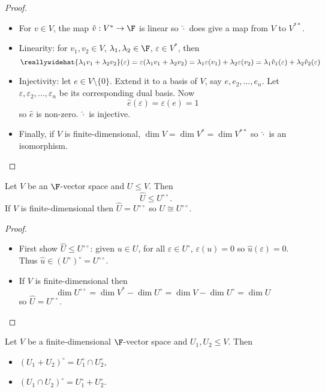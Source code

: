 \documentclass[a4paper]{article}
\newcommand*{\ann}{\circ}
\theoremstyle{definition}
\begin{document}
\begin{proof}\leavevmode
  \begin{itemize}
  \item For \(v\in V\), the map \(\hat v: V^* \to \F\) is linear so \(\hat \cdot\) does give a map from \(V\) to \(V^{**}\).
  \item Linearity: for \(v_1, v_2 \in V\), \(\lambda_1, \lambda_2 \in \F\), \(\varepsilon \in V^*\), then
    \[
      \reallywidehat{\lambda_1v_1 + \lambda_2v_2}(\varepsilon) = \varepsilon(\lambda_1v_1 + \lambda_2v_2) = \lambda_1 \varepsilon(v_1) + \lambda_2 \varepsilon(v_2) = \lambda_1 \hat v_1(\varepsilon) + \lambda_2 \hat v_2(\varepsilon)
    \]
  \item Injectivity: let \(e \in V\setminus\{0\}\). Extend it to a basis of \(V\), say \(e, e_2,\dots, e_n\). Let \(\varepsilon, \varepsilon_2,\dots, \varepsilon_n\) be its corresponding dual basis. Now
    \[
      \hat e(\varepsilon) = \varepsilon(e) = 1 
    \]
    so \(\hat e\) is non-zero. \(\hat \cdot\) is injective.
  \item Finally, if \(V\) is finite-dimensional, \(\dim V = \dim V^* = \dim V^{**}\) so \(\hat \cdot\) is an isomorphism.
  \end{itemize}
\end{proof}

\begin{lemma}
  Let \(V\) be an \(\F\)-vector space and \(U \leq V\). Then
  \[
    \hat U \leq U^{\ann \ann}.
  \]
  If \(V\) is finite-dimensional then \(\hat U = U^{\ann \ann}\) so \(U \cong U^{\ann \ann}\).
\end{lemma}

\begin{proof}\leavevmode
  \begin{itemize}
  \item First show \(\hat U \leq U^{\ann \ann}\): given \(u \in U\), for all \(\varepsilon \in U^\ann\), \(\varepsilon(u) = 0\) so \(\hat u(\varepsilon) = 0\). Thus \(\hat u \in (U^\ann)^\ann = U^{\ann \ann}\).
  \item If \(V\) is finite-dimensional then
    \[
      \dim U^{\ann \ann} = \dim V^* - \dim U^\ann = \dim V - \dim U^\ann = \dim U
    \] so \(\hat U = U^{\ann \ann}\).
  \end{itemize}
\end{proof}

\begin{lemma}
  Let \(V\) be a finite-dimensional \(\F\)-vector space and \(U_1, U_2 \leq V\). Then
  \begin{itemize}
  \item \((U_1 + U_2)^\ann = U_1^\ann \cap U_2^\ann\),
  \item \((U_1 \cap U_2)^\ann = U_1^\ann + U_2^\ann\).
  \end{itemize}
\end{lemma}
\end{document}
